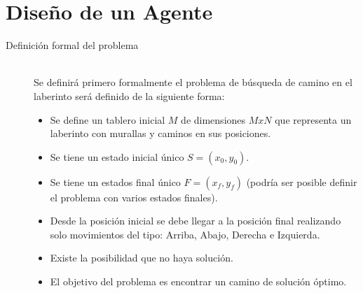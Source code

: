 \documentclass[letter, titlepage, 10pt]{article}
\begin{document}
\newpage

\section{Diseño de un Agente}

\begin{description}
  \item[Definición formal del problema] \hfill \\
Se definirá primero formalmente el problema de búsqueda de camino en el laberinto será definido de la siguiente forma:

\begin{itemize}
\item Se define un tablero inicial $M$ de dimensiones $MxN$ que representa un laberinto con murallas y caminos en sus posiciones.
\item Se tiene un estado inicial único $S = (x_0, y_0)$.
\item Se tiene un estados final único $F = (x_f, y_f)$ (podría ser posible definir el problema con varios estados finales).
\item Desde la posición inicial se debe llegar a la posición final realizando solo movimientos del tipo: Arriba, Abajo, Derecha e Izquierda.
\item Existe la posibilidad que no haya solución.
\item El objetivo del problema es encontrar un camino de solución óptimo.
\end{itemize}



\end{description}
\end{document}
